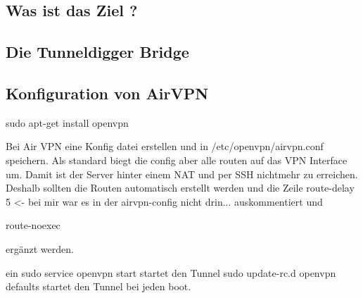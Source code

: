 \subsection{Was ist das Ziel ?}




\subsection{Die Tunneldigger Bridge}

 





\subsection{Konfiguration von AirVPN}

sudo apt-get install openvpn

Bei Air VPN eine Konfig datei erstellen und  in /etc/openvpn/airvpn.conf speichern.
Als standard biegt die config aber alle routen auf das VPN Interface um. Damit ist der Server hinter einem NAT und per SSH nichtmehr zu erreichen. 
Deshalb sollten die Routen automatisch erstellt werden und die Zeile
route-delay 5 <- bei mir war es in der airvpn-config nicht drin...
auskommentiert und

route-noexec

ergänzt werden.

ein 
sudo service openvpn start 
startet den Tunnel
sudo update-rc.d openvpn defaults
startet den Tunnel bei jeden boot.


















